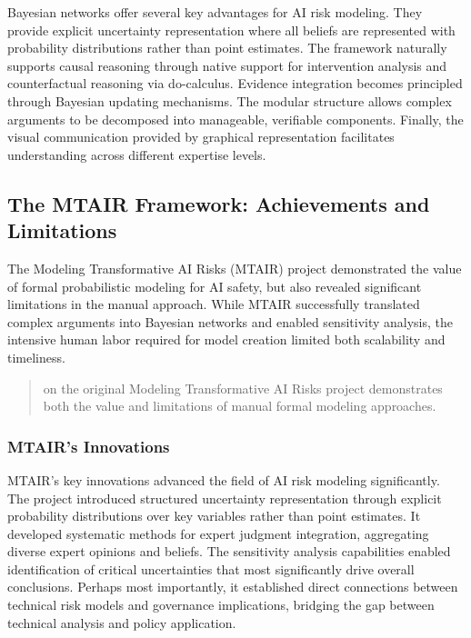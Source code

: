 \documentclass[
  11pt,
  letterpaper,
]{book}
\begin{document}
Bayesian networks offer several key advantages for AI risk modeling.
They provide explicit uncertainty representation where all beliefs are
represented with probability distributions rather than point estimates.
The framework naturally supports causal reasoning through native support
for intervention analysis and counterfactual reasoning via do-calculus.
Evidence integration becomes principled through Bayesian updating
mechanisms. The modular structure allows complex arguments to be
decomposed into manageable, verifiable components. Finally, the visual
communication provided by graphical representation facilitates
understanding across different expertise levels.

\subsection{The MTAIR Framework: Achievements and
Limitations}\label{sec-mtair-framework}

The Modeling Transformative AI Risks (MTAIR) project demonstrated the
value of formal probabilistic modeling for AI safety, but also revealed
significant limitations in the manual approach. While MTAIR successfully
translated complex arguments into Bayesian networks and enabled
sensitivity analysis, the intensive human labor required for model
creation limited both scalability and timeliness.

\begin{quote}
\textcite{bucknall2022} on the original Modeling Transformative AI Risks
project demonstrates both the value and limitations of manual formal
modeling approaches.
\end{quote}

\subsubsection{MTAIR's Innovations}\label{sec-mtair-innovations}

MTAIR's key innovations advanced the field of AI risk modeling
significantly. The project introduced structured uncertainty
representation through explicit probability distributions over key
variables rather than point estimates. It developed systematic methods
for expert judgment integration, aggregating diverse expert opinions and
beliefs. The sensitivity analysis capabilities enabled identification of
critical uncertainties that most significantly drive overall
conclusions. Perhaps most importantly, it established direct connections
between technical risk models and governance implications, bridging the
gap between technical analysis and policy application.
\end{document}
